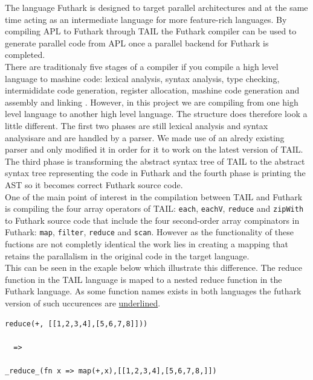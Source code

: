 \documentclass[11pt]{article}
\begin{document}
The language Futhark is designed to target parallel architectures and at the same time acting 
as an intermediate language for more feature-rich languages. By compiling APL to Futhark through TAIL the 
Futhark compiler can be used to generate parallel code from APL once a parallel backend for 
Futhark is completed.\\

There are traditionaly five stages of a compiler if you compile a high level language to mashine code: 
lexical analysis, syntax analysis, type checking, intermididate code generation, register allocation, mashine 
code generation and assembly and linking \cite{TorbenMogensen}. However, in this project we are compiling from 
one high level language to another high level language. The structure does therefore look a little different. 
The first two phases are still lexical analysis and syntax analysisare and are handled by a parser. We made use of an alredy existing parser \cite{APLACC} and only modified it in order for it to work on the latest 
version of TAIL. The third phase is transforming the abstract syntax tree of TAIL to the abstract syntax tree 
representing the code in Futhark and the fourth phase is printing the AST so it becomes correct 
Futhark source code. \\

One of the main point of interest in the compilation between TAIL and Futhark is compiling the four array operators 
of TAIL: {\tt each}, {\tt eachV}, 
 {\tt reduce} and {\tt zipWith} to Futhark source code that include the four second-order array compinators in Futhark:  
 {\tt map}, {\tt filter}, {\tt reduce} and {\tt scan}. However as the functionality of these fuctions are not completly 
 identical the work lies in creating a mapping that retains the parallalism in the original code in the target language.\\
 This can be seen in the exaple below which illustrate this difference. The reduce function in the
  TAIL language is maped to a nested reduce function in the Futhark language.
  As some function names exists in both languages the futhark version of such uccurences are \underline{underlined}.

\begin{lstlisting}[numbers=none,frame=none]
reduce(+, [[1,2,3,4],[5,6,7,8]]))

  =>

_reduce_(fn x => map(+,x),[[1,2,3,4],[5,6,7,8,]])

\end{lstlisting}
\end{document}
